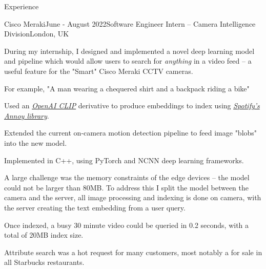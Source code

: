 \documentclass{structure}
\begin{document}
\begin{rSection}{Experience}

    \begin{rSubsection}{Cisco Meraki}{June - August 2022}{Software Engineer Intern -- Camera Intelligence Division}{London, UK}{}
        \item During my internship, I designed and implemented a novel deep learning model and pipeline which would allow users
        to search for \emph{anything} in a video feed -- a useful feature for the "Smart" Cisco Meraki CCTV cameras.
        \item For example, "A man wearing a chequered shirt and a backpack riding a bike"
        \item Used an \emph{\href{https://openai.com/blog/clip/}{OpenAI CLIP}} derivative to produce embeddings
        to index using \emph{\href{https://github.com/spotify/annoy}{Spotify's Annoy library}}.
        \item Extended the current on-camera motion detection pipeline to feed image "blobs" into the new model.
        \item Implemented in C++, using PyTorch and NCNN deep learning frameworks.
        \item A large challenge was the memory constraints of the edge devices -- the model could not be larger than 80MB.
        To address this I split the model between the camera and the server,
        all image processing and indexing is done on camera, with the server creating the text embedding from a user query.
        \item Once indexed, a busy 30 minute video could be queried in 0.2 seconds, with a total of 20MB index size.
        \item Attribute search was a hot request for many customers, most notably a for sale in all Starbucks restaurants.
        \item \href{https://gist.githubusercontent.com/tom-pollak/1a2e8c1fc61ba269e25c73c02c78007c/raw/45c8cbceda8cd745d6d00cb16a09979778df663b/gistfile1.txt}{\color{blue}{Project Reference}}
    \end{rSubsection}
\end{rSection}

\end{document}
